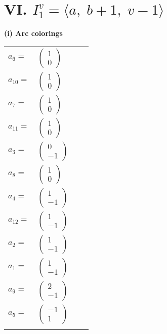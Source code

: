 \documentclass[1p]{elsarticle_modified}
\theoremstyle{definition}
\begin{document}
\centering \section*{VI. $I^v_{1}= \langle a,\;b+1,\;v-1 \rangle$}
\flushleft \textbf{(i) Arc colorings}\\
\begin{tabular}{m{7pt} m{180pt} m{7pt} m{180pt} }
\flushright $a_{6}=$&$\begin{pmatrix}1\\0\end{pmatrix}$ \\
\flushright $a_{10}=$&$\begin{pmatrix}1\\0\end{pmatrix}$ \\
\flushright $a_{7}=$&$\begin{pmatrix}1\\0\end{pmatrix}$ \\
\flushright $a_{11}=$&$\begin{pmatrix}1\\0\end{pmatrix}$ \\
\flushright $a_{3}=$&$\begin{pmatrix}0\\-1\end{pmatrix}$ \\
\flushright $a_{8}=$&$\begin{pmatrix}1\\0\end{pmatrix}$ \\
\flushright $a_{4}=$&$\begin{pmatrix}1\\-1\end{pmatrix}$ \\
\flushright $a_{12}=$&$\begin{pmatrix}1\\-1\end{pmatrix}$ \\
\flushright $a_{2}=$&$\begin{pmatrix}1\\-1\end{pmatrix}$ \\
\flushright $a_{1}=$&$\begin{pmatrix}1\\-1\end{pmatrix}$ \\
\flushright $a_{9}=$&$\begin{pmatrix}2\\-1\end{pmatrix}$ \\
\flushright $a_{5}=$&$\begin{pmatrix}-1\\1\end{pmatrix}$\\&\end{tabular}
\end{document}
